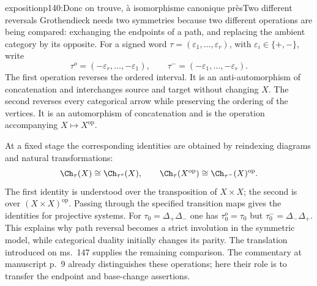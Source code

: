 \begin{dcomment}{exposition}{p140:Donc on trouve, à isomorphisme canonique près}{Two different reversals}
Grothendieck needs two symmetries because two different operations are being compared: exchanging the endpoints of a path, and replacing the ambient category by its opposite. For a signed word $\tau=(\varepsilon_1,\ldots,\varepsilon_r)$, with $\varepsilon_i\in\{+,-\}$, write
\[
 \tau^o=(-\varepsilon_r,\ldots,-\varepsilon_1),
 \qquad
 \tau^-=(-\varepsilon_1,\ldots,-\varepsilon_r).
\]
The first operation reverses the ordered interval. It is an anti-automorphism of concatenation and interchanges source and target without changing $X$. The second reverses every categorical arrow while preserving the ordering of the vertices. It is an automorphism of concatenation and is the operation accompanying $X\mapsto X^{\mathrm{op}}$.

At a fixed stage the corresponding identities are obtained by reindexing diagrams and natural transformations:
\[
 \Ch_\tau(X)\cong\Ch_{\tau^o}(X),
 \qquad
 \Ch_\tau(X^{\mathrm{op}})
          \cong\Ch_{\tau^-}(X)^{\mathrm{op}}.
\]
The first identity is understood over the transposition of $X\times X$; the second is over $(X\times X)^{\mathrm{op}}$. Passing through the specified transition maps gives the identities for projective systems. For $\tau_0=\Delta_+\Delta_-$ one has $\tau_0^o=\tau_0$ but $\tau_0^-=\Delta_-\Delta_+$. This explains why path reversal becomes a strict involution in the symmetric model, while categorical duality initially changes its parity. The translation introduced on ms.~147 supplies the remaining comparison. The commentary at manuscript p.~9 already distinguishes these operations; here their role is to transfer the endpoint and base-change assertions.
\end{dcomment}

